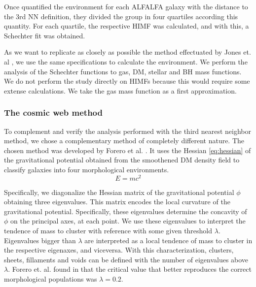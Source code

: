 \documentclass[a4paper,fleqn,usenatbib]{mnras}
\begin{document}
Once quantified the environment for each ALFALFA galaxy with the distance to the 3rd NN definition, they divided the group in four quartiles according this quantity. 
For each quartile, the respective HIMF was calculated, and with this, a Schechter fit was obtained. 
 
As we want to replicate as closely as possible the method effectuated by Jones et. al \cite{Jones2016}, we use the same specifications to calculate the environment.
We perform the analysis of the Schechter functions to gas, DM, stellar and BH mass functions.
We do not perform the study directly on HIMFs because this would require some extense calculations. We take the gas mass function as a first approximation.\\

\subsubsection{The cosmic web method}
To complement and verify the analysis performed with the third nearest neighbor method, we chose a complementary method of completely different nature. 
The chosen method was developed by Forero et al. \cite{Forero2009}. 
It uses the Hessian \ref{eq:hessian} of the gravitational potential obtained from the smoothened DM density field to classify galaxies into four morphological environments.\\  

\begin{equation}
E =  mc^2
\label{eq:hessian}
\end{equation}

Specifically, we diagonalize the Hessian matrix of the gravitational potential $\phi$ obtaining three eigenvalues. 
This matrix encodes the local curvature of the gravitational potential. 
Specifically, these eigenvalues determine the concavity of $\phi$ on the principal axes, at each point. 
We use these eigenvalues to interpret the tendence of mass to cluster with reference with some given threshold $\lambda$. 
Eigenvalues bigger than $\lambda$ are interpreted as a local tendence of mass to cluster in the respective eigenaxes, and viceversa. 
With this characterization, clusters, sheets, fillaments and voids can be defined with the number of eigenvalues above $\lambda$.
Forero et. al. found in \cite{Forero2009} that the critical value that better reproduces the correct morphological populations was $\lambda = 0.2$. \\
\end{document}
